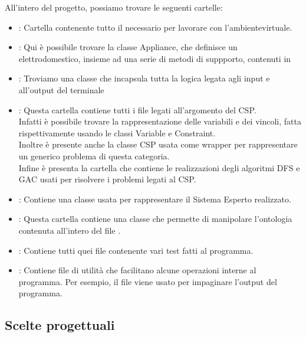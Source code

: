 \documentclass[12pt, letterpaper]{article}
\begin{document}
All'intero del progetto, possiamo trovare le seguenti cartelle:
\begin{itemize}
      \item {}: Cartella contenente tutto il necessario per lavorare con
            l'ambientevirtuale.
      \item {}: Qui è possibile trovare la classe Appliance, che definisce
            un elettrodomestico, insieme ad una serie di metodi di suppporto,
            contenuti in 

      \item {}: Troviamo una classe che incapsula tutta la logica legata agli input
            e all'output del terminale

      \item {}: Questa cartella contiene tutti i file legati all'argomento del
            CSP. \\
            Infatti è possibile trovare la rappresentazione delle variabili e dei vincoli, fatta
            rispettivamente usando le classi Variable e Constraint. \\
            Inoltre è presente anche la classe CSP usata come wrapper per rappresentare un generico
            problema di questa categoria. \\
            Infine è presenta la cartella  che contiene le realizzazioni degli
            algoritmi DFS e GAC usati per risolvere i problemi legati al CSP.

      \item {}: Contiene una classe usata per rappresentare il Sistema Esperto
            realizzato.

      \item {}: Questa cartella contiene una classe che permette di manipolare
            l'ontologia contenuta all'intero del file .

      \item {}: Contiene tutti quei file contenente vari test fatti al programma.

      \item {}: Contiene file di utilità che facilitano alcune operazioni interne al programma.
            Per esempio, il file  viene usato per impaginare l'output del programma.
\end{itemize}

\subsection{Scelte progettuali}
\end{document}

